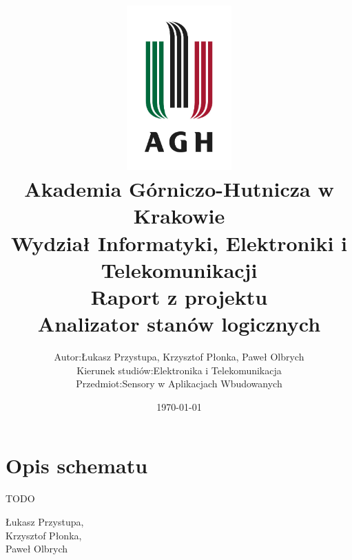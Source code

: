 \documentclass[12pt]{article}
\title{
    \includegraphics[width = 0.3\textwidth]{agh_logo.jpg}\\
    \textbf{Akademia Górniczo-Hutnicza w Krakowie}\\
    Wydział Informatyki, Elektroniki i  Telekomunikacji\\\vspace{2cm}
    \textbf{Raport z projektu}\\
    Analizator stanów logicznych
}
\author{
    \begin{tabularx}{\textwidth}{l l}
    Autor: &Łukasz Przystupa, Krzysztof Płonka, Paweł Olbrych\\
    Kierunek studiów: & Elektronika i Telekomunikacja\\
    Przedmiot:& Sensory w Aplikacjach Wbudowanych
    \end{tabularx}
}
\date{\vspace{2cm}\today}
\numberwithin{equation}{section}
\begin{document}
    \begin{titlepage}
        \maketitle
        \thispagestyle{empty}
    \end{titlepage}

        
        \tableofcontents
        \newpage

    
    

    \section{Opis schematu}
        TODO


    \vfill
    \begin{flushright}
        Łukasz Przystupa,\\
        Krzysztof Płonka,\\
        Paweł Olbrych
    \end{flushright}
\end{document}
